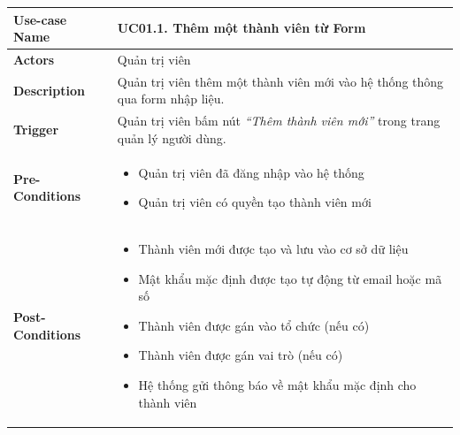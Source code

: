 \begin{table}[H]
\centering
\renewcommand{\arraystretch}{1.3}
\begin{tabular}{|m{}|m{}|}
\hline
\textbf{Use-case Name} 
& \textbf{UC01.1. Thêm một thành viên từ Form} \\ 
\hline

\textbf{Actors} 
& Quản trị viên \\ 
\hline

\textbf{Description} 
& Quản trị viên thêm một thành viên mới vào hệ thống thông qua form nhập liệu. \\ 
\hline

\textbf{Trigger} 
& Quản trị viên bấm nút \textit{``Thêm thành viên mới''} trong trang quản lý người dùng. \\ 
\hline

\textbf{Pre-Conditions} 
&
\begin{itemize}[label=--]
    \item Quản trị viên đã đăng nhập vào hệ thống
    \item Quản trị viên có quyền tạo thành viên mới
\end{itemize}
\\ 
\hline

\textbf{Post-Conditions} 
&
\begin{itemize}[label=--]
    \item Thành viên mới được tạo và lưu vào cơ sở dữ liệu
    \item Mật khẩu mặc định được tạo tự động từ email hoặc mã số
    \item Thành viên được gán vào tổ chức (nếu có)
    \item Thành viên được gán vai trò (nếu có)
    \item Hệ thống gửi thông báo về mật khẩu mặc định cho thành viên
\end{itemize}
\\ 
\hline


\end{tabular}
\end{table}
